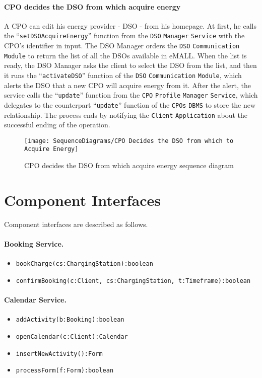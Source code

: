 \paragraph{CPO decides the DSO from which acquire energy}
A CPO can edit his energy provider - DSO - from his homepage.
At first, he calls the ``\verb|setDSOAcquireEnergy|'' function from the \verb|DSO| \verb|Manager| \verb|Service| with the CPO's identifier in input.
The DSO Manager orders the \verb|DSO| \verb|Communication| \verb|Module| to return the list of all the DSOs available in eMALL\@.
When the list is ready, the DSO Manager asks the client to select the DSO from the list, and then it runs the ``\verb|activateDSO|'' function of the \verb|DSO| \verb|Communication| \verb|Module|, which alerts the DSO that a new CPO will acquire energy from it.
After the alert, the service calls the ``\verb|update|'' function from the \verb|CPO| \verb|Profile| \verb|Manager| \verb|Service|, which delegates to the counterpart ``\verb|update|'' function of the \verb|CPOs| \verb|DBMS| to store the new relationship.
The process ends by notifying the \verb|Client| \verb|Application| about the successful ending of the operation.
\begin{figure}[H]
    \begin{center}
        \texttt{[image: SequenceDiagrams/CPO Decides the DSO from which to Acquire Energy]}
        \caption{CPO decides the DSO from which acquire energy sequence diagram}
        \label{cpo_decides_dso_from_which_acquire_energy}
    \end{center}
\end{figure}


\section{Component Interfaces}
\label{sec: component_interfaces}%
Component interfaces are described as follows.

\paragraph{Booking Service.}
\begin{itemize}
    \item \verb|bookCharge(cs:ChargingStation):boolean|
    \item \verb|confirmBooking(c:Client, cs:ChargingStation, t:Timeframe):boolean|
\end{itemize}

\paragraph{Calendar Service.}
\begin{itemize}
    \item \verb|addActivity(b:Booking):boolean|
    \item \verb|openCalendar(c:Client):Calendar|
    \item \verb|insertNewActivity():Form|
    \item \verb|processForm(f:Form):boolean|
\end{itemize}

